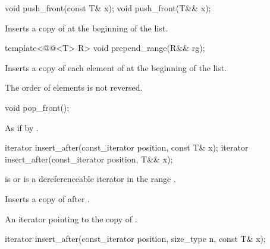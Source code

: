 %
\begin{itemdecl}
void push_front(const T& x);
void push_front(T&& x);
\end{itemdecl}

\begin{itemdescr}
\pnum
\effects
Inserts a copy of  at the beginning of the list.
\end{itemdescr}

%
\begin{itemdecl}
template<@@<T> R>
  void prepend_range(R&& rg);
\end{itemdecl}

\begin{itemdescr}
\pnum
\effects
Inserts a copy of each element of  at the beginning of the list.
\begin{note}
The order of elements is not reversed.
\end{note}
\end{itemdescr}

%
\begin{itemdecl}
void pop_front();
\end{itemdecl}

\begin{itemdescr}
\pnum
\effects
As if by .
\end{itemdescr}

%
\begin{itemdecl}
iterator insert_after(const_iterator position, const T& x);
iterator insert_after(const_iterator position, T&& x);
\end{itemdecl}

\begin{itemdescr}
\pnum
\expects
{} is  or is a dereferenceable
iterator in the range .

\pnum
\effects
Inserts a copy of  after .

\pnum
\returns
An iterator pointing to the copy of .
\end{itemdescr}

%
\begin{itemdecl}
iterator insert_after(const_iterator position, size_type n, const T& x);
\end{itemdecl}

